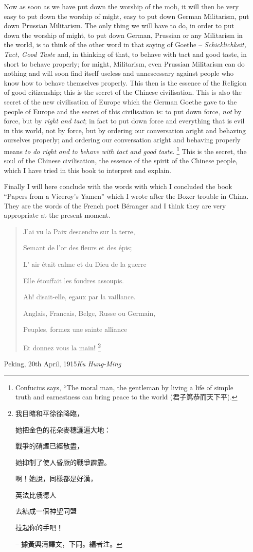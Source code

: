 Now as soon as we have put down the worship of 
the mob, it will then be very easy to put down the 
worship of might, easy to put down German Militarism, 
put down Prussian Militarism.
The only thing we will have to do, in order to put down the worship 
of might, to put down German, Prussian or any 
Militarism in the world, is to think of the other 
word in that saying of Goethe -- \emph{Schicklichkeit, Tact, 
Good Taste} and, in thinking of that, to behave 
with tact and good taste, in short to behave 
properly;
for might, Militarism, even Prussian 
Militarism can do nothing and will soon find itself 
useless and unnescessary against people who know 
how to behave themselves properly.
This then is the 
essence of the Religion of good citizenship; this is the 
secret of the Chinese civilisation. This is also the 
secret of the new civilisation of Europe which the 
German Goethe gave to the people of Europe and the 
secret of this civilisation is: to put down force, \emph{not} by 
force, but by \emph{right and tact};
in fact to put down force 
and everything that is evil in this world, not by force, 
but by ordering our conversation aright and behaving
ourselves properly;
and ordering our conversation
aright and behaving properly means \emph{to do right and to
behave with tact and good taste}. 
\footnote{Confucius says, ``The moral man, the gentleman by living a life 
of simple truth and earnestness can bring peace to the world (君子篤恭而天下平).}
This is the secret, the 
soul of the Chinese civilisation, the essence of the 
spirit of the Chinese people, which I have tried in this 
book to interpret and explain. 

Finally I will here conclude with the words with 
which I concluded the book ``Papers from a Viceroy's 
Yamen'' which I wrote after the Boxer trouble in China.
They are the words of the French poet 
B\'eranger and I think they are very appropriate at 
the present moment.

\begin{quote}
J'ai vu la Paix descendre sur la terre,

Semant de l'or des fleurs et des \'epis;

L' air \'etait calme et du Dieu de la guerre

Elle \'etouffait les foudres assoupis.

Ah! disait-elle, egaux par la vaillance.

Anglais, Francais, Belge, Russe ou Germain,

Peuples, formez une sainte alliance

Et donnez vous la main!
\footnote{我目睹和平徐徐降臨，

她把金色的花朵麥穗灑遍大地：

戰爭的硝煙已經散盡，

她抑制了使人昏厥的戰爭霹靂。

啊！她說，同樣都是好漢，

英法比俄德人

去結成一個神聖同盟

拉起你的手吧！

-- 據黃興濤譯文，下同。編者注。
}
\end{quote}


\vspace{\baselineskip}
\begin{flushright}\noindent
Peking, 20th April, 1915\hfill {\it Ku Hung-Ming}\\
\end{flushright}



